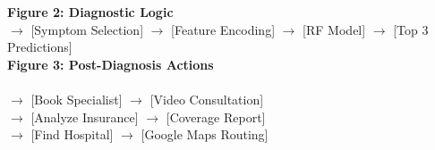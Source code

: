 \documentclass[12pt,a4paper]{article}
\begin{document}
\vspace{1cm}
\noindent\textbf{Figure 2: Diagnostic Logic}\\
[Vitals Input] $\rightarrow$ [Symptom Selection] $\rightarrow$ [Feature Encoding] $\rightarrow$ [RF Model] $\rightarrow$ [Top 3 Predictions]\\

\vspace{1cm}
\noindent\textbf{Figure 3: Post-Diagnosis Actions}\\
[Diagnosis Result]\\
$\rightarrow$ [Book Specialist] $\rightarrow$ [Video Consultation]\\
$\rightarrow$ [Analyze Insurance] $\rightarrow$ [Coverage Report]\\
$\rightarrow$ [Find Hospital] $\rightarrow$ [Google Maps Routing]
\end{document}

